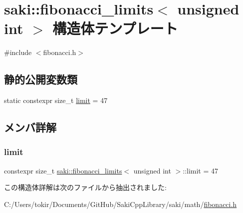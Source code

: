 \hypertarget{structsaki_1_1fibonacci__limits_3_01unsigned_01int_01_4}{}\section{saki\+:\+:fibonacci\+\_\+limits$<$ unsigned int $>$ 構造体テンプレート}
\label{structsaki_1_1fibonacci__limits_3_01unsigned_01int_01_4}


{\ttfamily \#include $<$fibonacci.\+h$>$}

\subsection*{静的公開変数類}
\begin{DoxyCompactItemize}
\item 
static constexpr size\+\_\+t \mbox{\hyperlink{structsaki_1_1fibonacci__limits_3_01unsigned_01int_01_4_ab6a13aa5a6c355d4f80e7315e216ded3}{limit}} = 47
\end{DoxyCompactItemize}


\subsection{メンバ詳解}
\mbox{\label{structsaki_1_1fibonacci__limits_3_01unsigned_01int_01_4_ab6a13aa5a6c355d4f80e7315e216ded3}} 
\subsubsection{\texorpdfstring{limit}{limit}}
{\footnotesize\ttfamily constexpr size\+\_\+t \mbox{\hyperlink{structsaki_1_1fibonacci__limits}{saki\+::fibonacci\+\_\+limits}}$<$ unsigned int $>$\+::limit = 47\hspace{0.3cm}{\ttfamily [static]}}



この構造体詳解は次のファイルから抽出されました\+:\begin{DoxyCompactItemize}
\item 
C\+:/\+Users/tokir/\+Documents/\+Git\+Hub/\+Saki\+Cpp\+Library/saki/math/\mbox{\hyperlink{fibonacci_8h}{fibonacci.\+h}}\end{DoxyCompactItemize}
